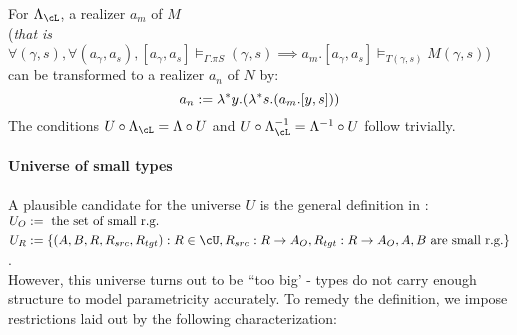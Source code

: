 \documentclass[12pt,a4paper]{article}
\def\src{_{src}}
\def\tgt{_{tgt}}
\renewcommand{\O}{_{O}}\alwaysmath{O}
\newcommand{\R}{\ensuremath{_{R}}}
\begin{document}
For $\Lambda_\cL$, a realizer $a_m$ of $M$\\
(\textit{that is } $\mathit{\forall (\gamma,s), \forall (a_\gamma, a_s), [a_\gamma, a_s] \vDash_{\Gamma. \pi S} (\gamma,s) \implies a_m. [a_\gamma, a_s] \vDash_{T(\gamma,s)} M(\gamma,s)}$)\\
can be transformed to a realizer $a_n$ of $N$ by:
$$a_n := \lambda^* y. (\lambda^* s . (a_m . [y, s]))$$ 
The conditions $U \comp \Lambda_\cL = \Lambda \comp U$ and $U \comp \Lambda^{-1}_\cL = \Lambda^{-1}\comp U$ follow trivially.

\paragraph*{Universe of small types}
A plausible candidate for the universe $U$ is the general definition in \cite{fill}:\\
$\begin{aligned}
  U\O &\define \text{ the set of small r.g. } \\
  U\R &\define \{(A, B, R, R\src, R\tgt) : R \in \cU, R\src: R \to A\O, R\tgt : R \to A\O, A,B \text{ are small r.g.}   \}
\end{aligned}$.\\

However, this universe turns out to be ``too big' - types do not carry enough structure to model parametricity accurately. To remedy the definition, we impose restrictions laid out by the following characterization:\\
\end{document}
